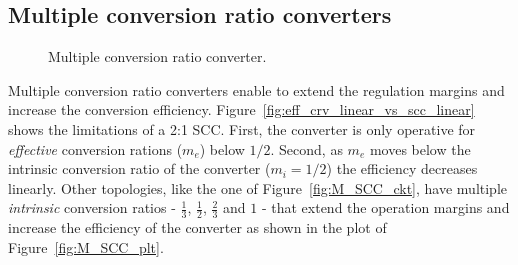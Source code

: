 \subsection{Multiple conversion ratio converters}
\begin{figure}[!h]
    \centering
    \parbox[b]{.45\linewidth}{
            \raggedright
            
            \label{fig:M_SCC_ckt}
    }
    \hfill
    \parbox[b]{.45\linewidth}{
            \raggedleft
            
            \label{fig:M_SCC_plt}
    }
    \caption{Multiple conversion ratio converter.}
    \label{fig:M_SCC}
\end{figure}
Multiple conversion ratio converters enable to extend the regulation margins and increase the conversion efficiency. Figure~\ref{fig:eff_crv_linear_vs_scc_linear} shows the limitations of a 2:1 SCC. First, the converter is only operative for \emph{effective} conversion rations ($m_e$) below $1/2$. Second, as $m_e$ moves below the intrinsic conversion ratio of the converter ($m_i=1/2$) the efficiency decreases linearly.
Other topologies, like the one of Figure~\ref{fig:M_SCC_ckt}, have multiple \emph{intrinsic} conversion ratios - $\frac{1}{3}$, $\frac{1}{2}$, $\frac{2}{3}$ and $1$ - that extend the operation margins and increase the efficiency of the converter as shown in the plot of Figure~\ref{fig:M_SCC_plt}.

